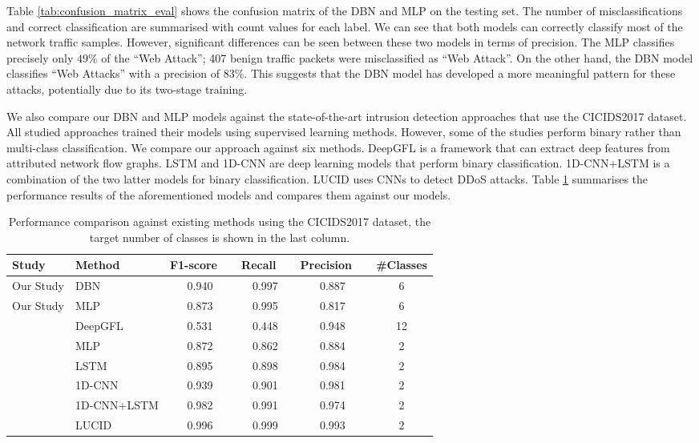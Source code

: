 \documentclass[runningheads]{llncs}
\begin{document}
Table \ref{tab:confusion_matrix_eval} shows the confusion matrix of the \ac{DBN} and \ac{MLP} on the testing set. The number of misclassifications and correct classification are summarised with count values for each label. We can see that both models can correctly classify most of the network traffic samples. However, significant differences can be seen between these two models in terms of precision. The \ac{MLP} classifies precisely only $49$\% of the ``Web Attack''; 407 benign traffic packets were misclassified as ``Web Attack''. On the other hand, the \ac{DBN} model classifies ``Web Attacks'' with a precision of $83$\%. This suggests that the \ac{DBN} model has developed a more meaningful pattern for these attacks, potentially due to its two-stage training.

We also compare our \ac{DBN} and \ac{MLP} models against the state-of-the-art intrusion detection approaches that use the CICIDS2017 dataset. All studied approaches trained their models using supervised learning methods. However, some of the studies perform binary rather than multi-class classification. We compare our approach against six methods. DeepGFL \cite{DeepGFL} is a framework that can extract deep features from attributed network flow graphs. LSTM and 1D-CNN \cite{1D-CNN-LSTM} are deep learning models that perform binary classification. 1D-CNN+LSTM \cite{1D-CNN-LSTM} is a combination of the two latter models for binary classification. LUCID \cite{LUCID} uses \ac{CNN}s to detect \ac{DDoS} attacks. Table \ref{tab:comparison} summarises the performance results of the aforementioned models and compares them against our models.

\begin{table}[t]
\caption{Performance comparison against existing methods using the CICIDS2017 dataset, the target number of classes is shown in the last column.}
\label{tab:comparison}
\centering
\begin{tabular}{p{2cm}p{2.5cm}cccc}
\toprule
\bf Study          & \bf Method   & \bf F1-score\ \    & \bf Recall\ \  & \bf Precision\ \  &  \bf \#Classes\\
\midrule
Our Study          & DBN          & 0.940    & 0.997    & 0.887   & 6 \\
Our Study          & MLP          & 0.873    & 0.995    & 0.817   & 6 \\
\cite{DeepGFL}     & DeepGFL      & 0.531    & 0.448    & 0.948   & 12\\
\cite{1D-CNN-LSTM} & MLP          & 0.872    & 0.862    & 0.884   & 2 \\
\cite{1D-CNN-LSTM} & LSTM         & 0.895    & 0.898    & 0.984   & 2 \\
\cite{1D-CNN-LSTM} & 1D-CNN       & 0.939    & 0.901    & 0.981   & 2 \\
\cite{1D-CNN-LSTM} & 1D-CNN+LSTM  & 0.982    & 0.991    & 0.974   & 2 \\
\cite{LUCID}       & LUCID        & 0.996    & 0.999    & 0.993   & 2 \\
\bottomrule
\end{tabular}
\end{table}
\end{document}
